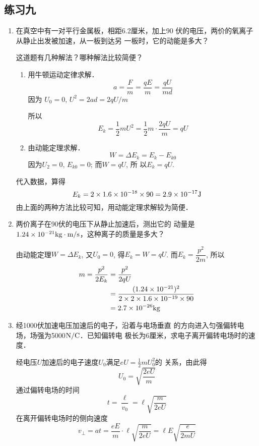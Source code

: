 \subsection{练习九}
\begin{enumerate}
	\item 在真空中有一对平行金属板，相距6.2厘米，加上90
伏的电压，两价的氧离子从静止出发被加速，从一板到达另
一板时，它的动能是多大？

这道题有几种解法？哪种解法比较简便？

\begin{solution}
\begin{enumerate}
    \item 用牛顿运动定律求解．
    \[a=\frac{F}{m}=\frac{qE}{m}=\frac{qU}{md}\]
    因为 $U_0=0$, $U^2=2ad=2qU/m$

    所以
    \[E_k=\frac{1}{2}mU^2=\frac{1}{2}m\cdot \frac{2qU}{m}=qU\]
    \item 由动能定理求解．
   \[ W=\Delta E_k=E_k-E_{k0}\]
   因为$U_2=0$, $E_{k0}=0$; 而$W=qU$, 所
    以$E_k=qU$. 
\end{enumerate}
代入数据，算得
    \[E_k=2\times1.6\times10^{-18}\times90=2.9\times10^{-17}{\rm J}\]
    由上面的两种方法比较可知，用动能定理求解较为简便．
\end{solution}

\item 两价离子在90伏的电压下从静止加速后，测出它的
动量是$1.24\times10^{-21}{\rm kg}\cdot \text{m}/\text{s}$，这种离子的质量是多大？


\begin{solution}
    由动能定理$W=\Delta E_k$, 又$U_0=0$, 得$E_k=W=qU$.
    而$E_k=\dfrac{p^2}{2m}$, 所以
 \[\begin{split}
     m=\frac{p^2}{2E_k}&=\frac{p^2}{2qU}\\
     &=\frac{(1.24\times10^{-21})^2}{2\times 2\times1.6\times10^{-19}\times 90}\\
     &=2.7\times10^{-26}{\rm kg}
 \end{split}\]   
\end{solution}

\item 经1000伏加速电压加速后的电子，沿着与电场垂直
的方向进入匀强偏转电场，场强为5000$\text{N}/\text{C}$．已知偏转电
极长为6厘米，求电子离开偏转电场时的速度．

\begin{solution}
    经电压$U$加速后的电子速度$U_0$满足$eU=\frac{1}{2}mU^2_0$的
    关系，由此得
 \[   U_0=\sqrt{\frac{2eU}{m}}\]
    通过偏转电场的时间
    \[t=\frac{\ell}{v_0}=\ell\sqrt{\frac{m}{2eU}}\]
    在离开偏转电场时的侧向速度
\[    v_{\bot}=at=\frac{eE}{m}\cdot \ell\sqrt{\frac{m}{2eU}}=\ell E\sqrt{\frac{e}{2mU}}\]


\end{solution}
\end{enumerate}
